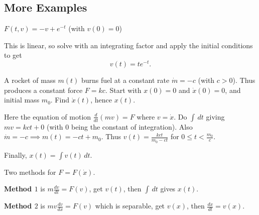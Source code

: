 \documentclass[10pt, a4paper]{article}
\begin{document}
\subsection{More Examples}

\begin{example}
    $F(t, v) = -v + e ^ {-t}$
    (with $v(0) = 0$)
    \begin{solution}
        This is linear,
        so solve with an integrating factor and apply the initial conditions to get
        \[
        v(t) = te ^ {-t}.
        \]
    \end{solution}
\end{example}

\begin{example}
    A rocket of mass $m(t)$ burns fuel at a constant rate $\dot{m} = -c$
    (with $c > 0$).
    Thus produces a constant force $F = kc$.
    Start with $x(0) = 0$ and $\dot{x}(0) = 0$,
    and initial mass $m_0$.
    Find $\dot{x}(t)$,
    hence $x(t)$.
    \begin{solution}
        Here the equation of motion $\frac{d}{dt}(mv) = F$ where $v = \dot{x}$.
        Do $\int\,dt$ giving $mv = kct + 0$
        (with $0$ being the constant of integration).
        Also $\dot{m} = -c \implies m(t) = -ct + m_0$.
        Thus $v(t) = \frac{kct}{m_0 - ct}$ for $0 \leq t < \frac{m_0}{c}$.

        Finally,
        $x(t) = \int v(t)\,dt$.
    \end{solution}
\end{example}

Two methods for $F = F(\dot{x})$.

\textbf{Method $1$}
is $m\frac{dv}{dt} = F(v)$,
get $v(t)$,
then $\int\,dt$ gives $x(t)$.

\textbf{Method $2$}
is $mv\frac{dv}{dx} = F(v)$ which is separable,
get $v(x)$,
then $\frac{dx}{dt} = v(x)$.
\end{document}
